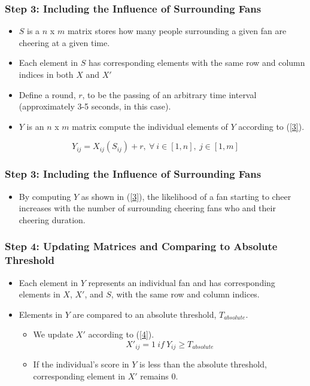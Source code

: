 \documentclass[compress,handout,10pt]{beamer}
\let\olditem\item
\renewcommand{\item}{\setlength{\itemsep}{0.5\baselineskip}\olditem}
\begin{document}
\begin{frame}
\frametitle{Step 3: Including the Influence of Surrounding Fans}
\begin{itemize}
\item $S$ is a $n$ x $m$ matrix stores how many people surrounding a given fan are cheering at a given time.
\item Each element in $S$ has corresponding elements with the same row and column indices in both $X$ and $X'$
\item Define a round, $r$, to be the passing of an arbitrary time interval (approximately 3-5 seconds, in this case). 
\item $Y$ is an $n$ x $m$ matrix compute the individual elements of $Y$ according to (\ref{3}). 
\end{itemize}
\begin{equation}
Y_{ij}=X_{ij}(S_{ij})+r,~\forall~i\in[1,n],~j\in[1,m]
\label{3}
\end{equation}
\end{frame}

\begin{frame}
	\frametitle{Step 3: Including the Influence of Surrounding Fans}
		\begin{itemize}
		\item By computing $Y$ as shown in (\ref{3}), the likelihood of a fan starting to cheer increases with the number of surrounding cheering fans who and their cheering duration.
		\end {itemize}
\end{frame}	 

\begin{frame}
\frametitle{Step 4: Updating Matrices and Comparing to Absolute Threshold}
\begin{itemize}
\item Each element in $Y$ represents an individual fan and has corresponding elements in $X$, $X'$, and $S$, with the same row and column indices. 
\item Elements in $Y$  are compared to an absolute threshold, $T_{absolute}$. \newline
	\begin{itemize} 
		\item We update $X'$ according to (\ref{4}).
		\begin{equation}
			X'_{ij}=1~if~Y_{ij}\geq T_{absolute}
			\label{4}
		\end{equation}
		\item If the individual's score in $Y$ is less than the absolute threshold, corresponding element in $X'$ remains 0.  
\end{itemize}
\end{itemize}
\end{frame}
\end{document}
